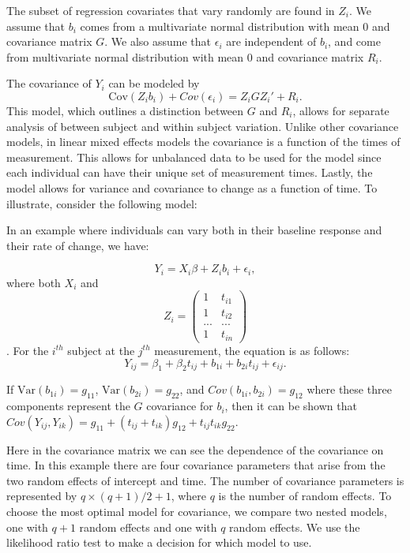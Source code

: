 \documentclass[12pt, twoside]{amherstthesis}
\begin{document}
The subset of regression covariates that vary randomly are found in \(Z_i\). We assume that \(b_i\) comes from a multivariate normal distribution with mean 0 and covariance matrix \(G\). We also assume that \(\epsilon_i\) are independent of \(b_i\), and come from multivariate normal distribution with mean 0 and covariance matrix \(R_i\).

The covariance of \(Y_i\) can be modeled by \[\text{Cov}(Z_ib_i) + Cov(\epsilon_i) = Z_iGZ_i' + R_i.\] This model, which outlines a distinction between \(G\) and \(R_i\), allows for separate analysis of between subject and within subject variation. Unlike other covariance models, in linear mixed effects models the covariance is a function of the times of measurement. This allows for unbalanced data to be used for the model since each individual can have their unique set of measurement times. Lastly, the model allows for variance and covariance to change as a function of time. To illustrate, consider the following model:

In an example where individuals can vary both in their baseline response and their rate of change, we have:

\[Y_i = X_i\beta+Z_ib_i+\epsilon_i,\] where both \(X_i\) and \[Z_i = \begin{pmatrix} 1 & t_{i1} \\ 1 & t_{i2} \\ ... & ... \\ 1 & t_{in}\end{pmatrix}\]. For the \(i^{th}\) subject at the \(j^{th}\) measurement, the equation is as follows: \[Y_{ij} = \beta_1 + \beta_2t_{ij} +b_{1i} + b_{2i}t_{ij} + \epsilon_{ij}.\]

If \(\text{Var}(b_{1i}) = g_{11}\), \(\text{Var}(b_{2i}) = g_{22}\), and \(Cov(b_{1i},b_{2i}) = g_{12}\) where these three components represent the \(G\) covariance for \(b_i\), then
it can be shown that \(Cov(Y_{ij}, Y_{ik}) = g_{11} + (t_{ij} + t_{ik})g_{12} + t_{ij}t_{ik}g_{22}\).

Here in the covariance matrix we can see the dependence of the covariance on time. In this example there are four covariance parameters that arise from the two random effects of intercept and time. The number of covariance parameters is represented by \(q \times (q+1)/2 + 1\), where \(q\) is the number of random effects. To choose the most optimal model for covariance, we compare two nested models, one with \(q+1\) random effects and one with \(q\) random effects. We use the likelihood ratio test to make a decision for which model to use.
\end{document}
